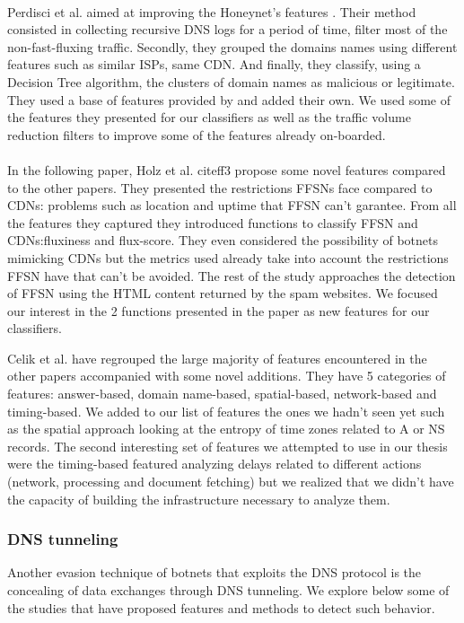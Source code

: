 \\
Perdisci et al. \cite{ff2} aimed at improving the Honeynet's features \cite{honeynet}. Their method consisted in collecting recursive DNS logs for a period of time, filter most of the non-fast-fluxing traffic. Secondly, they grouped the domains names using different features such as similar ISPs, same CDN. And finally, they classify, using a Decision Tree algorithm, the clusters of domain names as malicious or legitimate. They used a base of features provided by \cite{fluXOR} and added their own. We used some of the features they presented for our classifiers as well as the traffic volume reduction filters to improve some of the features already on-boarded. \\
\\
In the following paper, Holz et al. cite{ff3} propose some novel features compared to the other papers. They presented the restrictions FFSNs face compared to CDNs: problems such as location and uptime that FFSN can't garantee. From all the features they captured they introduced functions to classify FFSN and CDNs:fluxiness and flux-score. They even considered the possibility of botnets mimicking CDNs but the metrics used already take into account the restrictions FFSN have that can't be avoided. The rest of the study approaches the detection of FFSN using the HTML content returned by the spam websites. We focused our interest in the 2 functions presented in the paper as new features for our classifiers.

Celik et al. \cite{ff4} have regrouped the large majority of features encountered in the other papers accompanied with some novel additions. They have 5 categories of features: answer-based, domain name-based, spatial-based, network-based and timing-based. We added to our list of features the ones we hadn't seen yet such as the spatial approach looking at the entropy of time zones related to A or NS records. The second interesting set of features we attempted to use in our thesis were the timing-based featured analyzing delays related to different actions (network, processing and document fetching) but we realized that we didn't have the capacity of building the infrastructure necessary to analyze them.


\subsubsection{DNS tunneling}
Another evasion technique of botnets that exploits the DNS protocol is the concealing of data exchanges through DNS tunneling. We explore below some of the studies that have proposed features and methods to detect such behavior.

